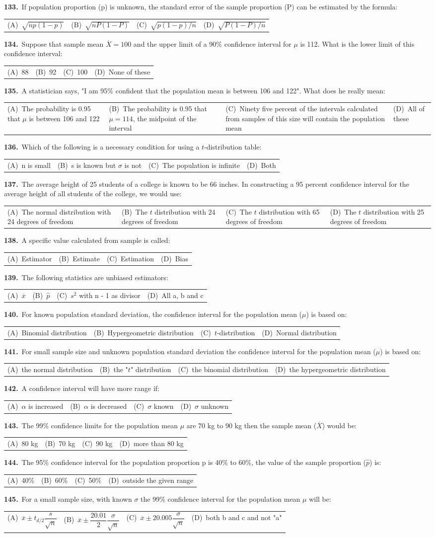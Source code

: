 \documentclass[11pt,a4paper]{article}
\makeatletter
\newcommand{\mcq}[6]{%
  \Needspace{4\baselineskip}%
  \par\medskip\noindent\textbf{#1.}\ #2\par\nopagebreak
  \noindent\begin{tabularx}{\linewidth}{@{\hspace{1.5em}}*{4}{>{\raggedright\arraybackslash}X}@{}}
    (A)~#3 & (B)~#4 & (C)~#5 & (D)~#6
  \end{tabularx}\par}
\makeatother
\begin{document}
\mcq{133}{If population proportion (p) is unknown, the standard error of the sample proportion (P) can be estimated by the formula:}{$\sqrt{np(1-p)}$}{$\sqrt{nP(1-P)}$}{$\sqrt{p(1-p)/n}$}{$\sqrt{P(1-P)/n}$}
\mcq{134}{Suppose that sample mean $\overline{X}=100$ and the upper limit of a 90\% confidence interval for $\mu$ is 112. What is the lower limit of this confidence interval:}{88}{92}{100}{None of these}
\mcq{135}{A statistician says, "I am 95\% confident that the population mean is between 106 and 122". What does he really mean:}{The probability is 0.95 that $\mu$ is between 106 and 122}{The probability is 0.95 that $\mu=114$, the midpoint of the interval}{Ninety five percent of the intervals calculated from samples of this size will contain the population mean}{All of these}
\mcq{136}{Which of the following is a necessary condition for using a $t$-distribution table:}{n is small}{s is known but $\sigma$ is not}{The population is infinite}{Both}
\mcq{137}{The average height of 25 students of a college is known to be 66 inches. In constructing a 95 percent confidence interval for the average height of all students of the college, we would use:}{The normal distribution with 24 degrees of freedom}{The $t$ distribution with 24 degrees of freedom}{The $t$ distribution with 65 degrees of freedom}{The $t$ distribution with 25 degrees of freedom}
\mcq{138}{A specific value calculated from sample is called:}{Estimator}{Estimate}{Estimation}{Bias}
\mcq{139}{The following statistics are unbiased estimators:}{$\overline{x}$}{$\widehat{p}$}{$s^{2}$ with n - 1 as divisor}{All a, b and c}
\mcq{140}{For known population standard deviation, the confidence interval for the population mean ($\mu$) is based on:}{Binomial distribution}{Hypergeometric distribution}{$t$-distribution}{Normal distribution}
\mcq{141}{For small sample size and unknown population standard deviation the confidence interval for the population mean ($\mu$) is based on:}{the normal distribution}{the "$t$" distribution}{the binomial distribution}{the hypergeometric distribution}
\mcq{142}{A confidence interval will have more range if:}{$\alpha$ is increased}{$\alpha$ is decreased}{$\sigma$ known}{$\sigma$ unknown}
\mcq{143}{The 99\% confidence limits for the population mean $\mu$ are 70 kg to 90 kg then the sample mean ($\overline{X}$) would be:}{80 kg}{70 kg}{90 kg}{more than 80 kg}
\mcq{144}{The 95\% confidence interval for the population proportion p is 40\% to 60\%, the value of the sample proportion ($\widehat{p}$) is:}{40\%}{60\%}{50\%}{outside the given range}
\mcq{145}{For a small sample size, with known $\sigma$ the 99\% confidence interval for the population mean $\mu$ will be:}{$\overline{x}\pm t_{d/2}\dfrac{s}{\sqrt{n}}$}{$\overline{x}\pm\dfrac{20.01}{2}\dfrac{\sigma}{\sqrt{n}}$}{$\overline{x}\pm20.005\dfrac{\sigma}{\sqrt{n}}$}{both b and c and not "a"}
\end{document}
